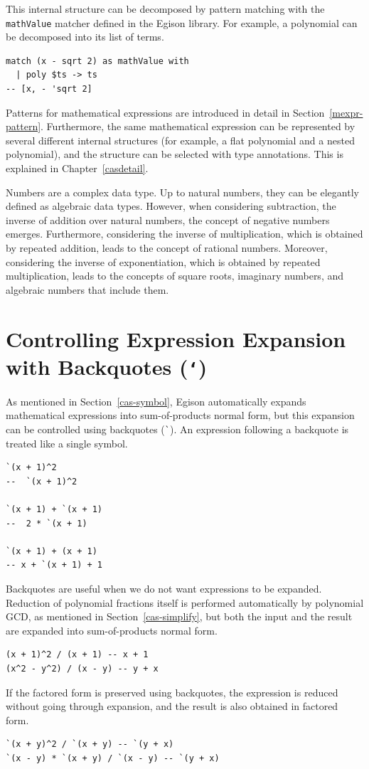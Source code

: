 This internal structure can be decomposed by pattern matching with the \lstinline{mathValue} matcher defined in the Egison library.
For example, a polynomial can be decomposed into its list of terms.
\begin{lstlisting}[language=egison,numbers=none]
match (x - sqrt 2) as mathValue with
  | poly $ts -> ts
-- [x, - 'sqrt 2]
\end{lstlisting}
Patterns for mathematical expressions are introduced in detail in Section~\ref{mexpr-pattern}.
Furthermore, the same mathematical expression can be represented by several different internal structures (for example, a flat polynomial and a nested polynomial), and the structure can be selected with type annotations.
This is explained in Chapter~\ref{casdetail}.

Numbers are a complex data type.
Up to natural numbers, they can be elegantly defined as algebraic data types.
However, when considering subtraction, the inverse of addition over natural numbers, the concept of negative numbers emerges.
Furthermore, considering the inverse of multiplication, which is obtained by repeated addition, leads to the concept of rational numbers.
Moreover, considering the inverse of exponentiation, which is obtained by repeated multiplication, leads to the concepts of square roots, imaginary numbers, and algebraic numbers that include them.

\section{Controlling Expression Expansion with Backquotes (\texttt{`})}\label{mexpr-backquote}

As mentioned in Section~\ref{cas-symbol}, Egison automatically expands mathematical expressions into sum-of-products normal form, but this expansion can be controlled using backquotes (\lstinline{`}).
An expression following a backquote is treated like a single symbol.
\begin{lstlisting}[language=egison,numbers=none,escapechar=']
`(x + 1)^2
--  `(x + 1)^2

`(x + 1) + `(x + 1)
--  2 * `(x + 1)

`(x + 1) + (x + 1)
-- x + `(x + 1) + 1
\end{lstlisting}

Backquotes are useful when we do not want expressions to be expanded.
Reduction of polynomial fractions itself is performed automatically by polynomial GCD, as mentioned in Section~\ref{cas-simplify}, but both the input and the result are expanded into sum-of-products normal form.
\begin{lstlisting}[language=egison,numbers=none,escapechar=']
(x + 1)^2 / (x + 1) -- x + 1
(x^2 - y^2) / (x - y) -- y + x
\end{lstlisting}
If the factored form is preserved using backquotes, the expression is reduced without going through expansion, and the result is also obtained in factored form.
\begin{lstlisting}[language=egison,numbers=none,escapechar=']
`(x + y)^2 / `(x + y) -- `(y + x)
`(x - y) * `(x + y) / `(x - y) -- `(y + x)
\end{lstlisting}

